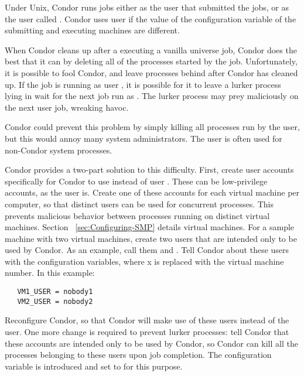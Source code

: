 Under Unix, Condor runs jobs either as the user that submitted the jobs,
or as the user called .
Condor uses user  if the value of the 
configuration variable of the
submitting and executing machines are different.

When Condor cleans up after a executing a vanilla universe job,
Condor does the best that it can by
deleting all of the processes started by the job.
Unfortunately, it is possible to fool Condor,
and leave processes behind after Condor has cleaned up.
If the job is running as user ,
it is possible for it to leave a lurker process lying in wait
for the next job run as .
The lurker process may prey maliciously on the next  user job,
wreaking havoc.

Condor could prevent this problem by simply killing all processes run by
the  user, but this would annoy many system administrators.
The  user is often used for non-Condor system processes.

Condor provides a two-part solution to this difficulty.
First, create user accounts specifically for Condor to use instead
of user .
These can be low-privilege accounts,
as the  user is.
Create one of these accounts for each
virtual machine per computer,
so that distinct users can be used for concurrent processes.
This prevents malicious behavior between
processes running on distinct virtual machines.
Section ~\ref{sec:Configuring-SMP} details virtual machines.
For a sample machine with two virtual machines,
create two users that are intended only to be used by Condor.
As an example, call them  and .
Tell Condor about these users
with the  configuration variables,
where x is replaced with the
virtual machine number. In this example:

\begin{verbatim}
   VM1_USER = nobody1
   VM2_USER = nobody2
\end{verbatim}

Reconfigure Condor, so that Condor will make use of these users
instead of the  user.
One more change is required to prevent lurker processes:
tell Condor that these accounts are intended only to be used by Condor,
so Condor can kill all the processes belonging to these users upon
job completion.
The configuration variable 
is introduced and set to  for this purpose.

